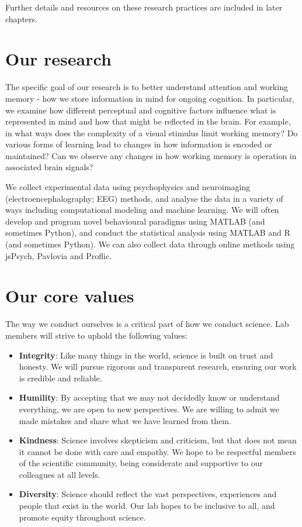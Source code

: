 \documentclass[
]{book}
\begin{document}
Further details and resources on these research practices are included in later chapters.

\hypertarget{our-research}{%
\section{Our research}\label{our-research}}

The specific goal of our research is to better understand attention and working memory - how we store information in mind for ongoing cognition. In particular, we examine how different perceptual and cognitive factors influence what is represented in mind and how that might be reflected in the brain. For example, in what ways does the complexity of a visual stimulus limit working memory? Do various forms of learning lead to changes in how information is encoded or maintained? Can we observe any changes in how working memory is operation in associated brain signals?

We collect experimental data using psychophysics and neuroimaging (electroencephalography; EEG) methods, and analyse the data in a variety of ways including computational modeling and machine learning. We will often develop and program novel behavioural paradigms using MATLAB (and sometimes Python), and conduct the statistical analysis using MATLAB and R (and sometimes Python). We can also collect data through online methods using jsPsych, Pavlovia and Proflic.

\hypertarget{lab-values}{%
\section{Our core values}\label{lab-values}}

The way we conduct ourselves is a critical part of how we conduct science. Lab members will strive to uphold the following values:

\begin{itemize}
\item
  \textbf{Integrity}: Like many things in the world, science is built on trust and honesty. We will pursue rigorous and transparent research, ensuring our work is credible and reliable.
\item
  \textbf{Humility}: By accepting that we may not decidedly know or understand everything, we are open to new perspectives. We are willing to admit we made mistakes and share what we have learned from them.
\item
  \textbf{Kindness}: Science involves skepticism and criticism, but that does not mean it cannot be done with care and empathy. We hope to be respectful members of the scientific community, being considerate and supportive to our colleagues at all levels.
\item
  \textbf{Diversity}: Science should reflect the vast perspectives, experiences and people that exist in the world. Our lab hopes to be inclusive to all, and promote equity throughout science.
\end{itemize}
\end{document}
